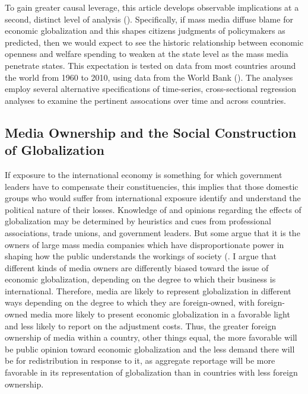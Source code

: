 \documentclass[12pt]{report}
\begin{document}
To gain greater causal leverage, this article develops observable implications at a second, distinct level of analysis (\citealt[30]{king1994designing}). Specifically, if mass media diffuse blame for economic globalization and this shapes citizens judgments of policymakers as predicted, then we would expect to see the historic relationship between economic openness and welfare spending to weaken at the state level as the mass media penetrate states. This expectation is tested on data from most countries around the world from 1960 to 2010, using data from the World Bank (\citealt{WorldDevelopmentIn:2012wl}). The analyses employ several alternative specifications of time-series, cross-sectional regression analyses to examine the pertinent assocations over time and across countries.

\subsection{Media Ownership and the Social Construction of Globalization}

If exposure to the international economy is something for which government leaders have to
compensate their constituencies, this implies that those domestic groups who would suffer from international exposure identify and understand the political nature of their losses. Knowledge of and opinions regarding the effects of globalization may be determined by heuristics and cues from professional associations, trade unions, and
government leaders. But some argue that it is the owners of large mass media companies which have disproportionate power in shaping how the public understands the workings of society (\citealt{Baker:2006te,Bagdikian:1980ci,Ben:1990tw}. I argue that different kinds of media owners are differently biased toward the issue of economic globalization, depending on the degree to which their business is international. Therefore, media are likely to represent globalization in different ways depending on the degree to which they are foreign-owned, with foreign-owned media more likely to present economic globalization in a favorable light and less likely to report on the adjustment costs. Thus, the greater foreign ownership of media within a country, other things equal, the more favorable will be public opinion toward economic globalization and the less demand there will be for redistribution in response to it, as aggregate reportage will be more favorable in its representation of globalization than in countries with less foreign ownership.
\end{document}
